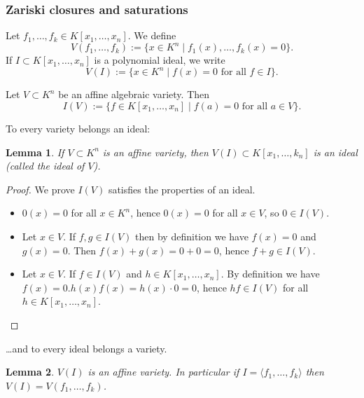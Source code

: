 \documentclass[
]{book}
\newtheorem{lemma}{Lemma}[chapter]
\theoremstyle{definition}
\theoremstyle{definition}
\theoremstyle{definition}
\theoremstyle{definition}
\theoremstyle{remark}
\begin{document}
\hypertarget{zariski-closures-and-saturations}{%
\subsubsection{Zariski closures and saturations}\label{zariski-closures-and-saturations}}

Let \(f_1,\ldots,f_k \in K[x_1,\ldots,x_n]\). We define
\[
V(f_1,\ldots,f_k) := \{ x \in K^n \mid f_1(x), \ldots, f_k(x) = 0 \}.
\]
If \(I \subset K[x_1,\ldots,x_n]\) is a polynomial ideal, we write
\[
V(I) := \{ x \in K^n \mid f(x) = 0 \text{ for all } f \in I \}.
\]

Let \(V \subset K^n\) be an affine algebraic variety. Then
\[
I(V) := \{ f \in K[x_1,\ldots,x_n] \mid f(a) = 0 \text{ for all } a \in V \}.
\]

To every variety belongs an ideal:

\begin{lemma}
If \(V \subset K^n\) is an affine variety, then \(V(I) \subset K[x_1,\ldots,k_n]\) is an ideal (called the ideal of \(V\)).
\end{lemma}

\begin{proof}

We prove \(I\left(V\right)\) satisfies the properties of an ideal.

\begin{itemize}
\item
  \(0\left(x\right)=0\) for all \(x\in K^{n}\), hence \(0\left(x\right)=0\) for all \(x\in V\), so \(0\in I\left(V\right)\).
\item
  Let \(x\in V\). If \(f,g\in I\left(V\right)\) then by definition we have \(f\left(x\right)=0\) and \(g\left(x\right)=0\). Then \(f\left(x\right)+g\left(x\right)=0+0=0\), hence \(f+g\in I\left(V\right)\).
\item
  Let \(x\in V\). If \(f\in I\left(V\right)\) and \(h\in K[x_{1},\ldots,x_{n}]\). By definition we have \(f\left(x\right)=0. h\left(x\right)f\left(x\right)=h\left(x\right)\cdot 0=0\), hence \(hf\in I\left(V\right)\) for all \(h\in K[x_{1},\ldots,x_{n}]\).
\end{itemize}

\end{proof}

\ldots and to every ideal belongs a variety.

\begin{lemma}
\(V(I)\) is an affine variety. In particular if \(I = \langle f_1,\ldots,f_k\rangle\) then \(V(I) = V(f_1,\ldots,f_k)\).
\end{lemma}
\end{document}
